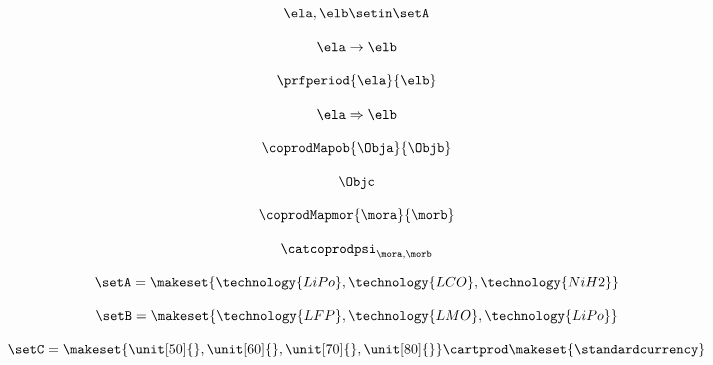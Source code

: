 {\begin{forslides}
        \begin{equation}
            \label{eq:feedback-081}
            \ela, \elb \setin \setA
        \end{equation}

        \begin{equation}
            \label{eq:feedback-082}
            \ela \to \elb
        \end{equation}

        \begin{equation}
            \label{eq:feedback-083}
            \prfperiod{\ela}{\elb}
        \end{equation}

        \begin{equation}
            \label{eq:feedback-084}
            \ela \Rightarrow \elb
        \end{equation}

        \begin{equation}
            \label{eq:feedback-085}
            \coprodMapob{\Obja}{\Objb}
        \end{equation}

        \begin{equation}
            \label{eq:feedback-086}
            \Objc
        \end{equation}

        \begin{equation}
            \label{eq:feedback-087}
            \coprodMapmor{\mora}{\morb}
        \end{equation}

        \begin{equation}
            \label{eq:feedback-088}
            \catcoprodpsi_{\mora, \morb}
        \end{equation}

        \begin{equation}
            \label{eq:feedback-089}
            \setA=\makeset{\technology{LiPo}, \technology{LCO},\technology{NiH2}}
        \end{equation}

        \begin{equation}
            \label{eq:feedback-090}
            \setB=\makeset{\technology{LFP},\technology{LMO},\technology{LiPo}}
        \end{equation}

        \begin{equation}
            \label{eq:feedback-091}
            \setC=\makeset{\unit[50]{},\unit[60]{},\unit[70]{},\unit[80]{}}\cartprod \makeset{\text{\standardcurrency}}
        \end{equation}


\end{forslides}}
